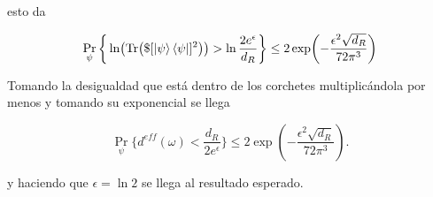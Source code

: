 \begin{enumerate}
esto da 

\begin{equation}
\Pr_{\psi}  \bigg \{ \ln (\Tr ( \$ [\ket{\psi}\bra{\psi}]^{2})) > \ln\frac{2e^{\epsilon}}{d_{R}} \bigg \} \leq 2 \exp (-\frac{\epsilon^{2} \sqrt{d_{R}}}{72 \pi^{3}})
\end{equation}

Tomando la desigualdad que está dentro de los corchetes  multiplicándola por menos y tomando su exponencial se llega

\begin{equation}
\Pr_{\psi} \bigg \{  d^{eff}(\omega) < \frac{d_{R}}{2e^{\epsilon}} \bigg \} \leq 2\exp(-\frac{\epsilon^{2}\sqrt{d_{R}}}{72\pi^{3}}).
\end{equation}

y haciendo que $\epsilon=\ln 2$ se llega al resultado esperado.
\\
\end{enumerate}

